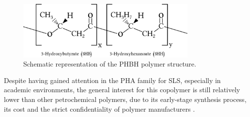\documentclass[a4paper]{article}
\begin{document}
    \begin{figure}[ht]
        \centering
        \includegraphics[width=0.8\textwidth]{Pictures/PHBH_chain.eps}
        \caption{Schematic representation of the PHBH polymer structure.}
        \label{fig:PHBH_structure}
    \end{figure}
    
    Despite having gained attention in the PHA family for SLS, especially in academic environments, the general interest for this copolymer
    is still relatively lower than other 
    petrochemical polymers, due to its early-stage synthesis process, its cost and the strict confidentiality 
    of polymer manufacturers \autocite{Eraslan_PHBH_review}.  

    
    \clearpage
\end{document}
